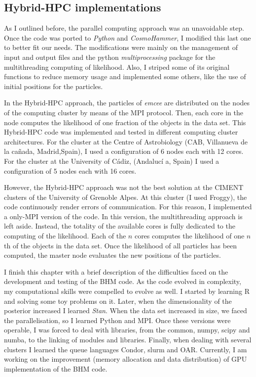 \subsection{Hybrid-HPC implementations}
\label{sect:HHPC}
As I outlined before, the parallel computing approach was an unavoidable step. Once the code was ported to \emph{Python} and \emph{CosmoHammer}, I modified this last one to better fit our needs. The modifications were mainly on the management of input and output files and the python \emph{multiprocessing} package for the multithreading computing of likelihood. Also, I striped some of its original functions to reduce memory usage and implemented some others, like the use of initial positions for the particles.

In the Hybrid-HPC approach, the particles of \emph{emcee} are distributed on the nodes of the computing cluster by means of the MPI protocol. Then, each core in the node computes the likelihood of one fraction of the objects in the data set. This Hybrid-HPC code was implemented and tested in different computing cluster architectures. For the cluster at the Centre of Astrobiology (CAB, Villanueva de la ca\~nada, Madrid,Spain), I used a configuration of 6 nodes each with 12 cores. For the cluster at the University of C\'adiz, (Andaluc\'i
a, Spain) I used a configuration of 5 nodes each with 16 cores.

However, the  Hybrid-HPC approach was not the best solution at the CIMENT clusters of the University of Grenoble Alpes. At this cluster (I used Froggy), the code continuously render errors of communication. For this reason, I implemented a only-MPI version of the code. In this version, the multithreading approach is left aside. Instead, the totality of the available cores is fully dedicated to the computing of the likelihood. Each of the $n$ cores computes the likelihood of one $n$th of the objects in the data set. Once the likelihood of all particles has been computed, the master node evaluates the new positions of the particles.

I finish this chapter with a brief description of the difficulties faced on the development and testing of the BHM code. As the code evolved in complexity, my computational skills were compelled to evolve as well. I started by learning R and solving some toy problems on it. Later, when the dimensionality of the posterior increased I learned \emph{Stan}. When the data set increased in size, we faced the parallelisation, so I learned Python and MPI. Once these versions were operable, I was forced to deal with libraries, from the common, numpy, scipy and numba, to the linking of modules and libraries. Finally, when dealing with several clusters I learned the queue languages Condor, slurm and OAR. Currently, I am working on the improvement (memory allocation and data distribution) of GPU implementation of the BHM code.  



